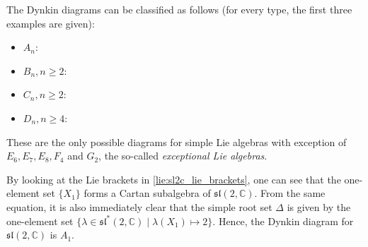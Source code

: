     \begin{property}[Classification]
        The Dynkin diagrams can be classified as follows (for every type, the first three examples are given):
        \begin{itemize}
            \item $A_n$: \begin{center}\dynk {}  \end{center}
        \item $B_n,n\geq2$: \begin{center}   \end{center}
        \item $C_n,n\geq2$: \begin{center}   \end{center}
        \item $D_n,n\geq4$: \begin{center}   \end{center}
        \end{itemize}
        These are the only possible diagrams for simple Lie algebras with exception of $E_6,E_7,E_8,F_4$ and $G_2$, the so-called \textit{exceptional Lie algebras}.
    \end{property}

    \begin{example}
        By looking at the Lie brackets in \cref{lie:sl2c_lie_brackets}, one can see that the one-element set $\{X_1\}$ forms a Cartan subalgebra of $\mathfrak{sl}(2,\mathbb{C})$. From the same equation, it is also immediately clear that the simple root set $\Delta$ is given by the one-element set $\{\lambda\in\mathfrak{sl}^*(2,\mathbb{C})\mid\lambda(X_1)\mapsto 2\}$. Hence, the Dynkin diagram for $\mathfrak{sl}(2,\mathbb{C})$ is $A_1$.
    \end{example}

